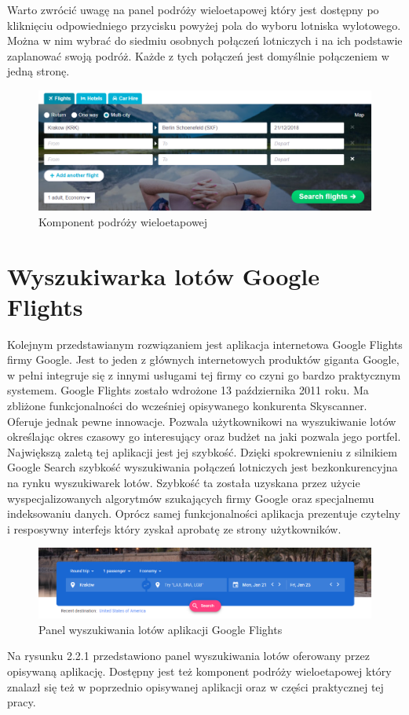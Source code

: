 \documentclass[12pt, twoside]{report}
\begin{document}
\newpage
Warto zwrócić uwagę na panel podróży wieloetapowej który jest dostępny po kliknięciu  odpowiedniego przycisku powyżej pola do wyboru lotniska wylotowego. Można w nim wybrać do siedmiu osobnych połączeń lotniczych i na ich podstawie zaplanować swoją podróż. Każde z tych połączeń jest domyślnie połączeniem w jedną stronę. 
\begin{figure}[!ht]
\centering
\includegraphics[scale=0.50, keepaspectratio]{skyscanner_multi.png}
\caption{Komponent podróży wieloetapowej}
\label{fig:skyscanner_multi}
\end{figure}

\section{Wyszukiwarka lotów Google Flights}
Kolejnym przedstawianym rozwiązaniem jest aplikacja internetowa Google Flights firmy Google. Jest to jeden z głównych internetowych produktów giganta Google, w pełni integruje się z innymi usługami tej firmy co czyni go bardzo praktycznym systemem. Google Flights zostało wdrożone 13 października 2011 roku. Ma zbliżone funkcjonalności do wcześniej opisywanego konkurenta Skyscanner. Oferuje jednak pewne innowacje. Pozwala użytkownikowi na wyszukiwanie lotów określając okres czasowy go interesujący oraz budżet na jaki pozwala jego portfel. Największą zaletą tej aplikacji jest jej szybkość. Dzięki spokrewnieniu z silnikiem Google Search szybkość wyszukiwania połączeń lotniczych jest bezkonkurencyjna na rynku wyszukiwarek lotów. Szybkość ta została uzyskana przez użycie wyspecjalizowanych algorytmów szukających firmy Google oraz specjalnemu indeksowaniu danych.
Oprócz samej funkcjonalności aplikacja prezentuje czytelny i resposywny interfejs który zyskał aprobatę ze strony użytkowników.


\begin{figure}[!ht]
\centering
\includegraphics[scale=0.50, keepaspectratio]{google_flights_search_panel.png}
\caption{Panel wyszukiwania lotów aplikacji Google Flights}
\label{fig:google_flights_search_panel}
\end{figure}
Na rysunku 2.2.1 przedstawiono panel wyszukiwania lotów oferowany przez opisywaną aplikację. Dostępny jest też komponent podróży wieloetapowej który znalazł się też w poprzednio opisywanej aplikacji oraz w części praktycznej tej pracy.
\end{document}
